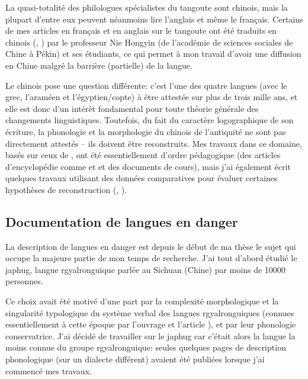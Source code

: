 \documentclass[oldfontcommands,oneside,a4paper,11pt]{article}
\begin{document}
La quasi-totalité des philologues spécialistes du tangoute sont chinois, mais la plupart d'entre eux peuvent néanmoins lire l'anglais et même le français. Certains de mes articles en français et en anglais sur le tangoute ont été traduits en chinois (\citealt{jacques08chuanshuo}, \citealt{jacques12chenghao}) par le professeur Nie Hongyin (de l'académie de sciences sociales de Chine à Pékin) et ses étudiants, ce qui permet à mon travail d'avoir une diffusion en Chine malgré la barrière (partielle) de la langue.


Le chinois pose une question différente: c'est l'une des quatre langues (avec le grec, l'araméen et l'égyptien/copte) à être attestée sur plus de trois mille ans, et elle est donc d'un intérêt  fondamental pour toute théorie générale des changements linguistiques. Toutefois, du fait du caractère  logographique de son écriture, la phonologie et la morphologie du chinois de l'antiquité ne sont pas directement attestés -- ils doivent être reconstruits. Mes travaux dans ce domaine, basés sur ceux de \citet{sagart99roc}, ont été essentiellement d'ordre pédagogique (des articles d'encyclopédie comme \citealt{jacques2015traditional} et  \citealt{jacques2015genetic} et des documents de cours), mais j'ai également écrit quelques travaux utilisant des données comparatives pour évaluer certaines hypothèses de reconstruction (\citealt{jacques00ywij}, \citealt{jacques05}).

\subsection{Documentation de langues en danger} \label{sec:documentation}
 
La description de langues en danger est depuis le début de ma thèse le sujet qui occupe la majeure partie de mon temps de recherche.  J'ai tout d'abord étudié le japhug, langue rgyalronguique parlée au Sichuan (Chine) par moins de 10000 personnes.

Ce choix avait été motivé d'une part par la complexité morphologique et la singularité typologique du système verbal des langues rgyalronguiques (connues essentiellement à cette époque par l'ouvrage \citealt{linxr93jiarong} et l'article \citealt{jackson00sidaba}), et par leur phonologie conservatrice. J'ai décidé de travailler sur le japhug car c'était alors la langue la moins connue du groupe rgyalronguique:  seules quelques pages de description phonologique (sur un dialecte différent) avaient été publiées lorsque j'ai commencé mes travaux.
\end{document}
